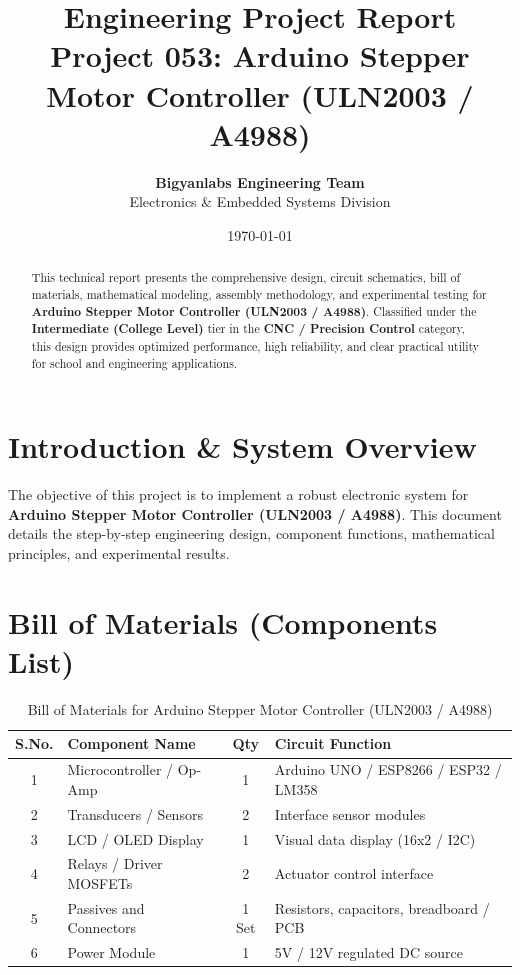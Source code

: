 \documentclass[11pt,a4paper]{article}
\title{\textbf{\Huge Engineering Project Report}\\[0.5em] \Large Project 053: Arduino Stepper Motor Controller (ULN2003 / A4988)}
\author{\textbf{Bigyanlabs Engineering Team}\\ Electronics \& Embedded Systems Division}
\date{\today}
\begin{document}
\maketitle
\thispagestyle{empty}

\begin{abstract}
This technical report presents the comprehensive design, circuit schematics, bill of materials, mathematical modeling, assembly methodology, and experimental testing for \textbf{Arduino Stepper Motor Controller (ULN2003 / A4988)}. Classified under the \textbf{Intermediate (College Level)} tier in the \textbf{CNC / Precision Control} category, this design provides optimized performance, high reliability, and clear practical utility for school and engineering applications.
\end{abstract}

\newpage
\tableofcontents
\newpage

\section{Introduction \& System Overview}
The objective of this project is to implement a robust electronic system for \textbf{Arduino Stepper Motor Controller (ULN2003 / A4988)}. This document details the step-by-step engineering design, component functions, mathematical principles, and experimental results.

\section{Bill of Materials (Components List)}
\begin{table}[h!]
\centering
\caption{Bill of Materials for Arduino Stepper Motor Controller (ULN2003 / A4988)}
\vspace{0.5em}
\begin{tabular}{clcp{7cm}}
\toprule
\textbf{S.No.} & \textbf{Component Name} & \textbf{Qty} & \textbf{Circuit Function} \\
\midrule
1 & Microcontroller / Op-Amp & 1 & Arduino UNO / ESP8266 / ESP32 / LM358 \\
2 & Transducers / Sensors & 2 & Interface sensor modules \\
3 & LCD / OLED Display & 1 & Visual data display (16x2 / I2C) \\
4 & Relays / Driver MOSFETs & 2 & Actuator control interface \\
5 & Passives and Connectors & 1 Set & Resistors, capacitors, breadboard / PCB \\
6 & Power Module & 1 & 5V / 12V regulated DC source \\
\bottomrule
\end{tabular}
\end{table}
\end{document}
